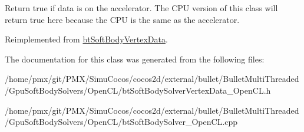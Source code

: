 Return true if data is on the accelerator. The C\+PU version of this class will return true here because the C\+PU is the same as the accelerator. 

Reimplemented from \hyperlink{classbtSoftBodyVertexData_a6512d196039f6445489a093ad18f7764}{bt\+Soft\+Body\+Vertex\+Data}.



The documentation for this class was generated from the following files\+:\begin{DoxyCompactItemize}
\item 
/home/pmx/git/\+P\+M\+X/\+Simu\+Cocos/cocos2d/external/bullet/\+Bullet\+Multi\+Threaded/\+Gpu\+Soft\+Body\+Solvers/\+Open\+C\+L/bt\+Soft\+Body\+Solver\+Vertex\+Data\+\_\+\+Open\+C\+L.\+h\item 
/home/pmx/git/\+P\+M\+X/\+Simu\+Cocos/cocos2d/external/bullet/\+Bullet\+Multi\+Threaded/\+Gpu\+Soft\+Body\+Solvers/\+Open\+C\+L/bt\+Soft\+Body\+Solver\+\_\+\+Open\+C\+L.\+cpp\end{DoxyCompactItemize}
